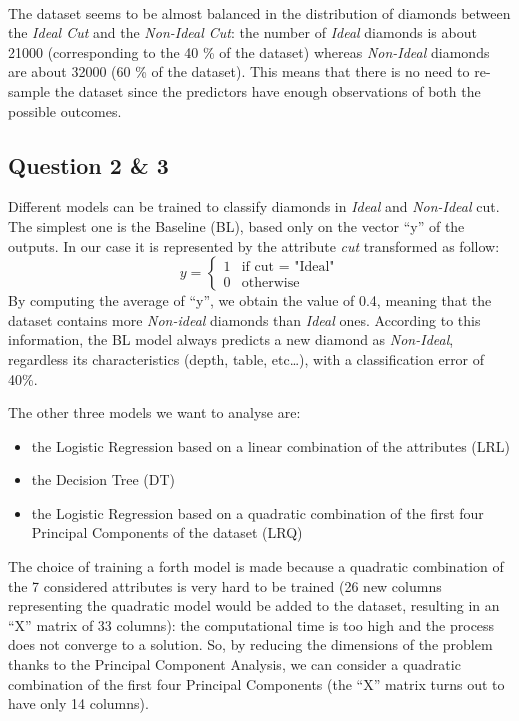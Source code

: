 \documentclass[
]{article}
\providecommand{\tightlist}{%
  \setlength{\itemsep}{0pt}\setlength{\parskip}{0pt}}
\begin{document}
~

The dataset seems to be almost balanced in the distribution of diamonds
between the \emph{Ideal Cut} and the \emph{Non-Ideal Cut}: the number of
\emph{Ideal} diamonds is about 21000 (corresponding to the 40 \% of the
dataset) whereas \emph{Non-Ideal} diamonds are about 32000 (60 \% of the
dataset). This means that there is no need to re-sample the dataset
since the predictors have enough observations of both the possible
outcomes.

\hypertarget{question-2-3}{%
\subsection{Question 2 \& 3}\label{question-2-3}}

Different models can be trained to classify diamonds in \emph{Ideal} and
\emph{Non-Ideal} cut. The simplest one is the Baseline (BL), based only
on the vector ``y'' of the outputs. In our case it is represented by the
attribute \emph{cut} transformed as follow: \[ y =
\begin{cases}
1 & \text{if cut = "Ideal"} \\
0 & \text{otherwise}
\end{cases} \] By computing the average of ``y'', we obtain the value of
0.4, meaning that the dataset contains more \emph{Non-ideal} diamonds
than \emph{Ideal} ones. According to this information, the BL model
always predicts a new diamond as \emph{Non-Ideal}, regardless its
characteristics (depth, table, etc\ldots), with a classification error
of 40\%.

The other three models we want to analyse are:

\begin{itemize}
\tightlist
\item
  the Logistic Regression based on a linear combination of the
  attributes (LRL)
\item
  the Decision Tree (DT)
\item
  the Logistic Regression based on a quadratic combination of the first
  four Principal Components of the dataset (LRQ)
\end{itemize}

The choice of training a forth model is made because a quadratic
combination of the 7 considered attributes is very hard to be trained
(26 new columns representing the quadratic model would be added to the
dataset, resulting in an ``X'' matrix of 33 columns): the computational
time is too high and the process does not converge to a solution. So, by
reducing the dimensions of the problem thanks to the Principal Component
Analysis, we can consider a quadratic combination of the first four
Principal Components (the ``X'' matrix turns out to have only 14
columns).
\end{document}
